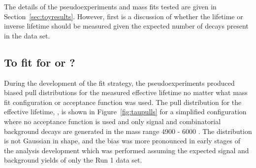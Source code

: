  The details of the pseudoexperiments and mass fits tested are given in Section~\ref{sec:toyresults}. However, first is a discussion of whether the lifetime or inverse lifetime should be measured given the expected number of decays present in the data set.  

\subsection[To fit for $\tau$ or $\tau^{-1}$?]{To fit for \boldmath{$\tau$} or ?}
\label{sec:tauORinvtau}
During the development of the fit strategy, the pseudoexperiments produced biased pull distributions for the measured \bsmumu effective lifetime no matter what mass fit configuration or acceptance function was used. The pull distribution for the effective lifetime, \tmumu, is shown in Figure~\ref{fig:taupulls} for a simplified configuration where no acceptance function is used and only signal and combinatorial background decays are generated in the mass range 4900 - 6000 \mevcc. The distribution is not Gaussian in shape, and the bias was more pronounced in early stages of the analysis development which was performed assuming the expected signal and background yields of only the Run 1 data set.%

